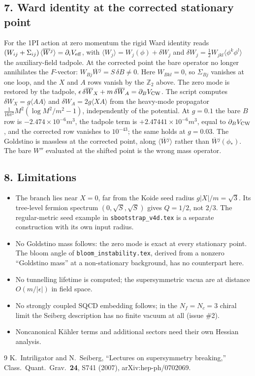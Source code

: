 \documentclass[11pt]{article}
\begin{document}
\subsection*{7. Ward identity at the corrected stationary point}

For the 1PI action at zero momentum the rigid Ward identity reads
$(W_{ij}+\Sigma_{ij})\,\langle\overline{W}{}^j\rangle=\partial_iV_{\rm eff}$,
with $\langle W_j\rangle=W_j(\phi)+\delta W_j$ and
$\delta W_j=\tfrac12W_{jkl}\langle\phi^k\phi^l\rangle$ the auxiliary-field
tadpole. At the corrected point the bare operator no longer annihilates
the $F$-vector: $W_{Bj}\overline W{}^j=S\,\delta B\neq0$. Here $W_{Bkl}=0$,
so $\Sigma_{Bj}$ vanishes at one loop, and the $X$ and $A$ rows vanish by
the $\mathbb Z_2$ above. The zero mode is restored by the tadpole,
$\epsilon\,\delta\overline W_X+m\,\delta\overline W_A=\partial_BV_{\rm CW}$. The script
computes $\delta W_X=g\langle AA\rangle$ and $\delta W_A=2g\langle XA\rangle$
from the heavy-mode propagator $\frac{1}{16\pi^2}M^2(\log M^2/m^2-1)$,
independently of the potential. At $g=0.1$ the bare $B$ row is
$-2.474\times10^{-6}m^3$, the tadpole term is $+2.47441\times10^{-6}m^3$,
equal to $\partial_BV_{\rm CW}$, and the corrected row vanishes to
$10^{-43}$; the same holds at $g=0.03$. The Goldstino is massless at the
corrected point, along $\langle\overline W{}^j\rangle$ rather than
$\overline W{}^j(\phi_*)$. The bare $W''$ evaluated at the shifted point is
the wrong mass operator.

\subsection*{8. Limitations}

\begin{itemize}
\item The branch lies near $X=0$, far from the Koide seed radius
$g|X|/m=\sqrt3$. Its tree-level fermion spectrum $(0,\sqrt S,\sqrt S)$
gives $Q=1/2$, not $2/3$. The regular-metric seed example in
\texttt{sbootstrap\_v4d.tex} is a separate construction with its own
input radius.
\item No Goldstino mass follows: the zero mode is exact at every
stationary point. The bloom angle of \texttt{bloom\_instability.tex},
derived from a nonzero ``Goldstino mass'' at a non-stationary background,
has no counterpart here.
\item No tunnelling lifetime is computed; the supersymmetric vacua are at
distance $O(m/|\epsilon|)$ in field space.
\item No strongly coupled SQCD embedding follows; in the $N_f=N_c=3$ chiral
limit the Seiberg description has no finite vacuum at all (issue \#2).
\item Noncanonical K\"ahler terms and additional sectors need their own
Hessian analysis.
\end{itemize}

\begin{thebibliography}{9}
K.~Intriligator and N.~Seiberg, ``Lectures on supersymmetry breaking,''
Class.\ Quant.\ Grav.\ \textbf{24}, S741 (2007), arXiv:hep-ph/0702069.
\end{thebibliography}
\end{document}
